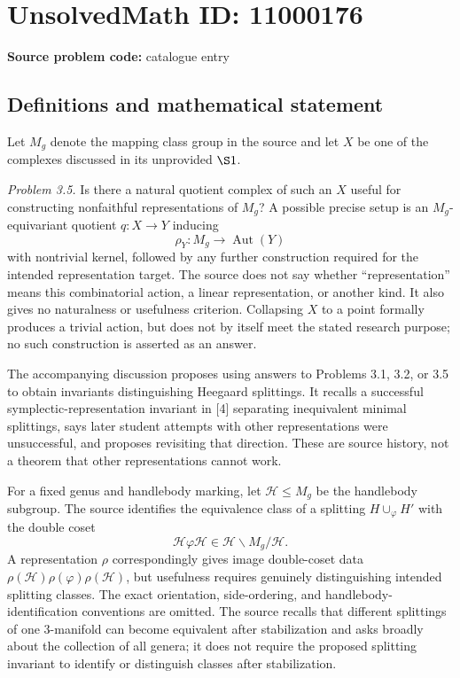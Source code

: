 \documentclass[11pt]{article}
\begin{document}
\section*{UnsolvedMath ID: 11000176}
\textbf{Source problem code:} catalogue entry
\subsection{Definitions and mathematical statement}
Let \(M_g\) denote the mapping class group in the source and let \(X\) be one of the complexes discussed in its unprovided \(\S1\).

\emph{Problem 3.5.} Is there a natural quotient complex of such an \(X\) useful for constructing nonfaithful representations of \(M_g\)? A possible precise setup is an \(M_g\)-equivariant quotient \(q:X\to Y\) inducing
\[
 \rho_Y:M_g\longrightarrow\operatorname{Aut}(Y)
\]
with nontrivial kernel, followed by any further construction required for the intended representation target. The source does not say whether ``representation'' means this combinatorial action, a linear representation, or another kind. It also gives no naturalness or usefulness criterion. Collapsing \(X\) to a point formally produces a trivial action, but does not by itself meet the stated research purpose; no such construction is asserted as an answer.

The accompanying discussion proposes using answers to Problems 3.1, 3.2, or 3.5 to obtain invariants distinguishing Heegaard splittings. It recalls a successful symplectic-representation invariant in [4] separating inequivalent minimal splittings, says later student attempts with other representations were unsuccessful, and proposes revisiting that direction. These are source history, not a theorem that other representations cannot work.

For a fixed genus and handlebody marking, let \(\mathcal H\leq M_g\) be the handlebody subgroup. The source identifies the equivalence class of a splitting \(H\cup_\varphi H'\) with the double coset
\[
 \mathcal H\varphi\mathcal H\in\mathcal H\backslash M_g/\mathcal H.
\]
A representation \(\rho\) correspondingly gives image double-coset data \(\rho(\mathcal H)\rho(\varphi)\rho(\mathcal H)\), but usefulness requires genuinely distinguishing intended splitting classes. The exact orientation, side-ordering, and handlebody-identification conventions are omitted. The source recalls that different splittings of one \(3\)-manifold can become equivalent after stabilization and asks broadly about the collection of all genera; it does not require the proposed splitting invariant to identify or distinguish classes after stabilization.
\end{document}
